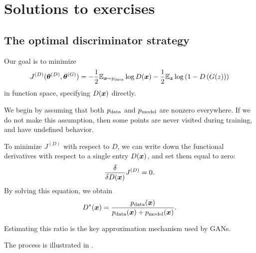 \section{Solutions to exercises}
\label{sec:solutions}

\subsection{The optimal discriminator strategy}
\label{sec:opt_d_soln}

Our goal is to minimize
\begin{equation}
  J^{(D)}({\bm{\theta}}^{(D)}, {\bm{\theta}}^{(G)}) = -\frac{1}{2} \mathbb{E}_{{\bm{x}} \sim p_{\rm{data}}} \log D({\bm{x}}) - \frac{1}{2} \mathbb{E}_{{\bm{z}}} \log \left(1 - D\left( G(z) \right) \right)
\end{equation}
in function space, specifying $D({\bm{x}})$ directly.

We begin by assuming that both $p_{\rm{data}}$ and $p_{\rm{model}}$ are nonzero everywhere.
If we do not make this assumption, then some points are never visited during training,
and have undefined behavior.

To minimize $J^{(D)}$ with respect to $D$, we can write down the functional derivatives with
respect to a single entry $D({\bm{x}})$, and set them equal to zero:
\[
\frac{\delta} {\delta D({\bm{x}})} J^{(D)} = 0.
\]
By solving this equation, we obtain
\[
D^*({\bm{x}}) = \frac{ p_{\rm{data}}({\bm{x}}) } {p_{\rm{data}}({\bm{x}}) + p_{\rm{model}}({\bm{x}}) }.
\]

Estimating this ratio is the key approximation mechanism used by GANs.

The process is illustrated in .

